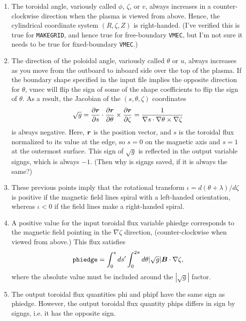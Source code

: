 \documentclass[11pt,letter]{article}
\newcommand{\vect}[1]{\mbox{\boldmath $#1$}}
\newcommand{\vmec}{{\tt VMEC}}
\newcommand{\makegrid}{{\tt MAKEGRID}}
\begin{document}
\begin{enumerate}
\item
The toroidal angle, variously called $\phi$, $\zeta$, or $v$, always increases in a counter-clockwise direction when the plasma is viewed from above.
Hence, the cylindrical coordinate system $(R,\zeta,Z)$ is right-handed.
(I've verified this is true for \makegrid, and hence true for free-boundary \vmec, but I'm not sure it needs to be true for fixed-boundary \vmec.)
\item
The direction of the poloidal angle, variously called $\theta$ or $u$, always increases as you move from the outboard to inboard
side over the top of the plasma. If the boundary shape specified in the input file implies the opposite direction for $\theta$,
vmec will flip the sign of some of the shape coefficients to flip the sign of $\theta$. As a result, the Jacobian of the $(s,\theta,\zeta)$
coordinates 
\begin{equation}
\sqrt{g} = \frac{\partial \vect{r}}{\partial s} \cdot \frac{\partial\vect{r}}{\partial\theta} \times \frac{\partial\vect{r}}{\partial\zeta}
= \frac{1} {\nabla s \cdot \nabla\theta\times\nabla\zeta}
\end{equation}
is always negative. Here, $\vect{r}$ is the position vector, and $s$ is the toroidal flux normalized to its value at the edge, so $s=0$ on the magnetic axis and $s=1$ at the outermost surface.
This sign of $\sqrt{g}$ is reflected in the output variable {\ttfamily signgs}, which is always $-1$.
(Then why is {\ttfamily signgs} saved, if it is always the same?)
\item
These previous points imply that the rotational transform $\iota = d(\theta + \lambda) / d\zeta$ is positive if the magnetic
field lines spiral with a left-handed orientation, whereas $\iota<0$ if the field lines make a right-handed spiral.
\item
A positive value for the input toroidal flux variable {\ttfamily phiedge} corresponds to the magnetic field pointing in the $\nabla \zeta$ direction,
(counter-clockwise when viewed from above.) This flux satisfies
\begin{equation}
\mathtt{phiedge} = \int_0^s ds' \int_0^{2\pi} d\theta | \sqrt{g}| \vect{B}\cdot\nabla\zeta,
\end{equation}
where the absolute value must be included around the $| \sqrt{g}|$ factor.
\item
The output toroidal flux quantities {\ttfamily phi} and {\ttfamily phipf} have the same sign as {\ttfamily phiedge}.
However, the output toroidal flux quantity {\ttfamily phips} differs in sign by {\ttfamily signgs}, i.e. it has the opposite sign.

\end{enumerate}
\end{document}
